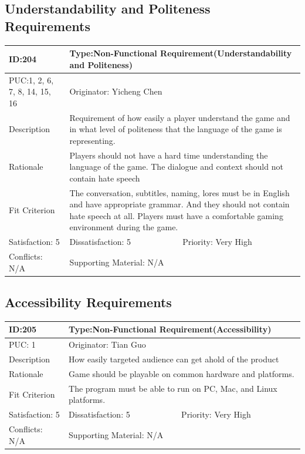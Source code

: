 \documentclass{article}
\begin{document}
\subsection{Understandability and Politeness Requirements}
\begin{table}[H]
    \begin{tabular}{|l|l|l|}
    \hline
    ID:204 & \multicolumn{2}{l|}{Type:Non-Functional Requirement(Understandability and Politeness)} \\ \hline
    PUC:1, 2, 6, 7, 8, 14, 15, 16 & \multicolumn{2}{l|}{Originator: Yicheng Chen} \\ \hline
    Description & \multicolumn{2}{m{0.85\textwidth}|}{Requirement of how easily a player understand the game and in what level of politeness that the language of the game is representing.} \\ \hline
    Rationale & \multicolumn{2}{m{0.85\textwidth}|}{Players should not have a hard time understanding the language of the game. The dialogue and context should not contain hate speech} \\ \hline
    Fit Criterion & \multicolumn{2}{m{0.85\textwidth}|}{The conversation, subtitles, naming, lores must be in English and have appropriate grammar. And they should not contain hate speech at all. Players must have a comfortable gaming environment during the game.} \\ \hline
    Satisfaction: 5 & Dissatisfaction: 5 & Priority: Very High \\ \hline
    Conflicts: N/A & \multicolumn{2}{l|}{Supporting Material: N/A} \\ \hline
    \end{tabular}
    \end{table}
    
\subsection{Accessibility Requirements}
\begin{table}[H]
    \begin{tabular}{|l|l|l|}
    \hline
    ID:205 & \multicolumn{2}{l|}{Type:Non-Functional Requirement(Accessibility)} \\ \hline
    PUC: 1 & \multicolumn{2}{l|}{Originator: Tian Guo} \\ \hline
    Description & \multicolumn{2}{m{0.85\textwidth}|}{How easily targeted audience can get ahold of the product} \\ \hline
    Rationale & \multicolumn{2}{m{0.85\textwidth}|}{Game should be playable on common hardware and platforms.} \\ \hline
    Fit Criterion & \multicolumn{2}{m{0.85\textwidth}|}{The program must be able to run on PC, Mac, and Linux platforms.} \\ \hline
    Satisfaction: 5 & Dissatisfaction: 5 & Priority: Very High \\ \hline
    Conflicts: N/A & \multicolumn{2}{l|}{Supporting Material: N/A} \\ \hline
    \end{tabular}
    \end{table}
\end{document}
